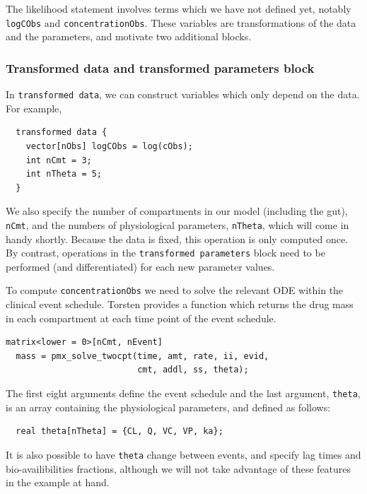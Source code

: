 The likelihood statement involves terms which we have not defined yet, notably \texttt{logCObs} and \texttt{concentrationObs}.
These variables are transformations of the data and the parameters,
and motivate two additional blocks.

\subsubsection{Transformed data and transformed parameters block} \label{sec:twocpt_transformed_parameters}

In \texttt{transformed data}, we can construct variables which only depend on the data.
For example,
\begin{lstlisting}
  transformed data {
    vector[nObs] logCObs = log(cObs);
    int nCmt = 3;
    int nTheta = 5; 
  }
\end{lstlisting}
We also specify the number of compartments in our model (including the gut), \texttt{nCmt}, and the numbers of physiological parameters, \texttt{nTheta}, which will come in handy shortly.
Because the data is fixed, this operation is only computed once.
By contrast, operations in the \texttt{transformed parameters} block need to be performed (and differentiated) for each new parameter values.

To compute \texttt{concentrationObs} we need to solve the relevant ODE within the clinical event schedule.
Torsten provides a function which returns the drug mass in each compartment at each time point of the event schedule.
\begin{lstlisting}
matrix<lower = 0>[nCmt, nEvent] 
  mass = pmx_solve_twocpt(time, amt, rate, ii, evid,
                          cmt, addl, ss, theta);
\end{lstlisting}
%
The first eight arguments define the event schedule and the last argument, \texttt{theta}, is an array containing the physiological parameters, and defined as follows:
\begin{lstlisting}
  real theta[nTheta] = {CL, Q, VC, VP, ka};
\end{lstlisting}
%
It is also possible to have \texttt{theta} change between events, and specify lag times and bio-availibilities fractions, although we will not take advantage of these features in the example at hand.

